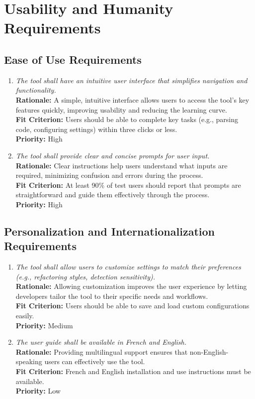 \documentclass[12pt]{article}
\begin{document}
\section{Usability and Humanity Requirements}
\subsection{Ease of Use Requirements}
\begin{enumerate}[label=UHR-EOU \arabic*., wide=0pt, leftmargin=*]
    \item \emph{The tool shall have an intuitive user interface that simplifies navigation and functionality.}\\[2mm]
    {\bf Rationale:} A simple, intuitive interface allows users to access the tool's key features quickly, improving usability and reducing the learning curve.\\
    {\bf Fit Criterion:} Users should be able to complete key tasks (e.g., parsing code, configuring settings) within three clicks or less.\\
    {\bf Priority:} High
    \item \emph{The tool shall provide clear and concise prompts for user input.}\\[2mm]
    {\bf Rationale:} Clear instructions help users understand what inputs are required, minimizing confusion and errors during the process.\\
    {\bf Fit Criterion:} At least 90\% of test users should report that prompts are straightforward and guide them effectively through the process.\\
    {\bf Priority:} High
\end{enumerate}

\subsection{Personalization and Internationalization Requirements}
\begin{enumerate}[label=UHR-PSI \arabic*., wide=0pt, leftmargin=*]
    \item \emph{The tool shall allow users to customize settings to match their preferences (e.g., refactoring styles, detection sensitivity).}\\[2mm]
    {\bf Rationale:} Allowing customization improves the user experience by letting developers tailor the tool to their specific needs and workflows.\\
    {\bf Fit Criterion:} Users should be able to save and load custom configurations easily.\\
    {\bf Priority:} Medium
    \item \emph{The user guide shall be available in French and English.}\\[2mm]
    {\bf Rationale:} Providing multilingual support ensures that non-English-speaking users can effectively use the tool.\\
    {\bf Fit Criterion:} French and English installation and use instructions must be available.\\
    {\bf Priority:} Low
\end{enumerate}
\end{document}
